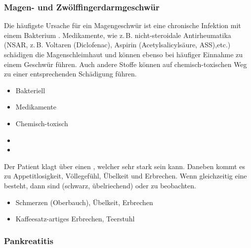 {\subsubsection{Magen- und Zwölffingerdarmgeschwür}
\label{topic:gastritis}



{
Die häufigste Ursache für ein Magengeschwür ist eine
chronische Infektion mit einem Bakterium  \citep{Malfertheiner2004}. Medikamente, wie
z.\,B. nicht-steroidale Antirheumatika (NSAR, z.\,B.
Voltaren{\texttrademark} (Diclofenac),
Aspirin{\texttrademark} (Acetylsalicylsäure, ASS),etc.)
schädigen die Magenschleimhaut und können ebenso bei
häufiger Einnahme zu einem Geschwür führen. Auch andere
Stoffe können auf chemisch-toxischen Weg zu einer
entsprechenden Schädigung führen.  
}{
\begin{itemize}
    \item Bakteriell 
    \item Medikamente
    \item Chemisch-toxisch
    \item {}
    \item {}
\end{itemize}
}{}{}{}

{Der Patient klagt über einen
, welcher sehr stark sein
kann. Daneben kommt es zu Appetitlosigkeit, Völlegefühl,
Übelkeit und Erbrechen. Wenn gleichzeitig eine 
besteht, dann sind 
(schwarz, übelriechend) oder  zu beobachten. 
}{
\begin{itemize}
    \item Schmerzen (Oberbauch), Übelkeit, Erbrechen
    \item Kaffeesatz-artiges Erbrechen, Teerstuhl
\end{itemize}
}{}{}{}


\subsubsection{Pankreatitis}

\label{topic:pankreatitis}

}
